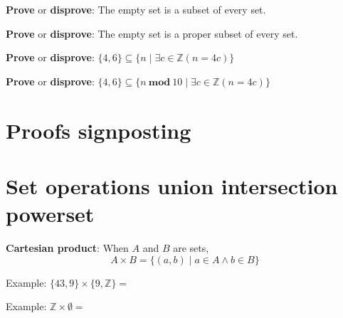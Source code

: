 \documentclass[12pt, oneside]{article}
\begin{document}
\vspace{150pt}

{\bf Prove} or {\bf  disprove}: The empty set is a subset of every set.

\vspace{150pt}

{\bf Prove} or {\bf  disprove}: The empty set is a proper subset of every set.

\vspace{150pt}

{\bf Prove} or {\bf  disprove}: $\{ 4, 6 \} \subseteq \{ n \mid  \exists c \in \mathbb{Z} ( n = 4c) \} $

\vspace{150pt}

{\bf Prove} or {\bf  disprove}: $\{ 4, 6 \} \subseteq \{ n ~\textbf{mod}~10 \mid  \exists c \in \mathbb{Z} ( n = 4c) \} $

\vspace{150pt}

 \vfill
\section*{Proofs signposting}


 \vfill
\section*{Set operations union intersection powerset}


{\bf Cartesian product}: When $A$ and  $B$ are sets, 
\[
    A \times  B = \{ (a,b) \mid a \in A  \wedge b  \in B \}
\]

Example: $\{43, 9\} \times  \{9, \mathbb{Z}\}  = $
    
Example: $\mathbb{Z} \times \emptyset  = $
\end{document}
